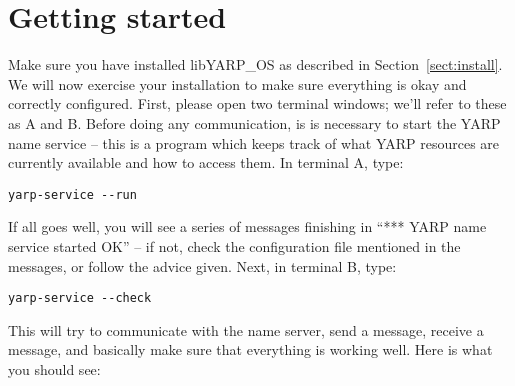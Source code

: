 


\section{Getting started}

Make sure you have installed libYARP\_OS as described in
Section~\ref{sect:install}.  We will now exercise your installation to
make sure everything is okay and correctly configured.  First, please
open two terminal windows; we'll refer to these as A and B.
%
Before doing any communication, is is necessary to start the YARP name
service -- this is a program which keeps track of what YARP resources
are currently available and how to access them.
%
In terminal A, type:

\begin{verbatim}
yarp-service --run
\end{verbatim}

If all goes well, you will see a series of messages finishing in ``***
YARP name service started OK'' -- if not, check the configuration file
mentioned in the messages, or follow the advice given.
%
Next, in terminal B, type:
%
\begin{verbatim}
yarp-service --check
\end{verbatim}
%
This will try to communicate with the name server, send a message,
receive a message, and basically make sure that everything is
working well.  Here is what you should see:


